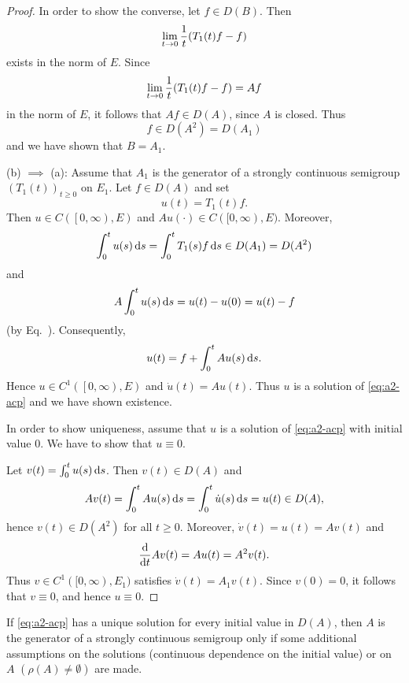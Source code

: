 \begin{proof}
In order to show the converse, let $f \in D(B)$.
Then 
\[ 
\lim_{t \to 0} \frac{1}{t} \mleft( T_{1}(t)f - f \mright)
\]
exists in the norm of\/ $E$.
Since  
\[ 
\lim_{t \to 0} \frac{1}{t} \mleft( T_{1}(t)f - f \mright)
= Af 
\]
in the norm of $E$, it follows that $Af \in D(A)$, since $A$ is closed.
Thus 
\[
f \in D(A^{2}) = D(A_{1})
\]
and we have shown that $B = A_{1}$.

(b)  $\implies$ (a):  
Assume that $A_{1}$ is the generator of a strongly continuous semigroup $(T_{1}(t))_{t \geq 0}$ on $E_{1}$.
Let $f \in D(A)$ and set 
\[
u(t) = T_{1}(t)f.
\]
Then $u \in C(\left[0,\infty\right),E)$ and $Au(\cdot) \in C([0,\infty),E)$.
Moreover, 
\[
\int_{0}^{t} u(s) \mathop{}\!\mathrm{d}{s} = \int_{0}^{t} T_{1}(s) f   \mathop{}\!\mathrm{d}{s} \in D(A_{1}) = D(A^{2})
\]
and 
\[
A\int_{0}^{t} u(s) \mathop{}\!\mathrm{d}{s} = u(t) - u(0) = u(t) - f
\]
(by Eq.~).
Consequently, 
\[
    u(t) = f + \int_{0}^{t} Au(s) \mathop{}\!\mathrm{d}{s} .
\]
Hence $u \in C^{1}(\left[0,\infty  \right),E)$ and $\dot{u}(t) = Au(t)$.
Thus $u$ is a solution of \eqref{eq:a2-acp} and we have shown existence.

In order to show uniqueness, assume that $u$ is a solution of \eqref{eq:a2-acp} with initial value $0$.
We have to show that $u \equiv 0$.

Let $v(t) = \int_{0}^{t} u(s)\mathop{}\!\mathrm{d}{s}$.
Then $v(t) \in D(A)$ and
\[
    Av(t) = \int_{0}^{t} Au(s)\mathop{}\!\mathrm{d}{s} 
          = \int_{0}^{t} \dot{u}(s)\mathop{}\!\mathrm{d}{s} 
          = u(t) \in D(A),
\]
hence $v(t) \in D(A^{2})$ for all $t \geq 0$.
Moreover, $\dot{v}(t) = u(t) = Av(t)$ and
\[
    \frac{\mathop{}\!\mathrm{d}{}}{\mathop{}\!\mathrm{d}{t}}Av(t) = Au(t) = A^{2}v(t).
\]
Thus $v \in C^{1}([0,\infty), E_{1})$ satisfies $\dot{v}(t) = A_{1}v(t)$.
Since $v(0) = 0$, it follows that $v \equiv 0$, and hence $u \equiv 0$.
\end{proof}
If \eqref{eq:a2-acp} has a unique solution for every initial value in $D(A)$, then $A$ is the generator of a strongly continuous semigroup only if some additional assumptions on the solutions (continuous dependence on the initial value) or on $A$ $(\rho(A) \neq \emptyset)$ are made.
